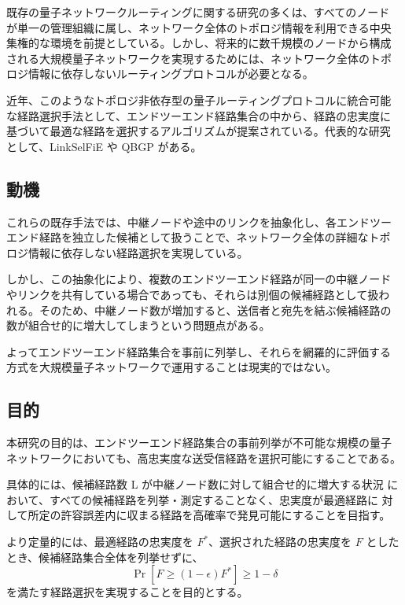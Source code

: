 \documentclass[conference]{IEEEtran}
\begin{document}
既存の量子ネットワークルーティングに関する研究の多くは、すべてのノード
が単一の管理組織に属し、ネットワーク全体のトポロジ情報を利用できる中央
集権的な環境を前提としている。しかし、将来的に数千規模のノードから構成
される大規模量子ネットワークを実現するためには、ネットワーク全体のトポ
ロジ情報に依存しないルーティングプロトコルが必要となる。

近年、このようなトポロジ非依存型の量子ルーティングプロトコルに統合可能
な経路選択手法として、エンドツーエンド経路集合の中から、経路の忠実度に
基づいて最適な経路を選択するアルゴリズムが提案されている。代表的な研究
として、LinkSelFiE や QBGP がある。


\subsection{動機}
\label{sec:org03a6144}

これらの既存手法では、中継ノードや途中のリンクを抽象化し、各エンドツー
エンド経路を独立した候補として扱うことで、ネットワーク全体の詳細なトポ
ロジ情報に依存しない経路選択を実現している。

しかし、この抽象化により、複数のエンドツーエンド経路が同一の中継ノード
やリンクを共有している場合であっても、それらは別個の候補経路として扱わ
れる。そのため、中継ノード数が増加すると、送信者と宛先を結ぶ候補経路の
数が組合せ的に増大してしまうという問題点がある。

よってエンドツーエンド経路集合を事前に列挙し、それらを網羅的に評価する
方式を大規模量子ネットワークで運用することは現実的ではない。

\subsection{目的}
\label{sec:org1b1fc42}

本研究の目的は、エンドツーエンド経路集合の事前列挙が不可能な規模の量子
ネットワークにおいても、高忠実度な送受信経路を選択可能にすることである。

具体的には、候補経路数 L が中継ノード数に対して組合せ的に増大する状況
において、すべての候補経路を列挙・測定することなく、忠実度が最適経路に
対して所定の許容誤差内に収まる経路を高確率で発見可能にすることを目指す。

より定量的には、最適経路の忠実度を \(F^\ast\)、選択された経路の忠実度を
\(F\) としたとき、候補経路集合全体を列挙せずに、
\[
\Pr\left[ F \geq (1-\epsilon)F^\ast \right] \geq 1-\delta
\]
を満たす経路選択を実現することを目的とする。
\end{document}
